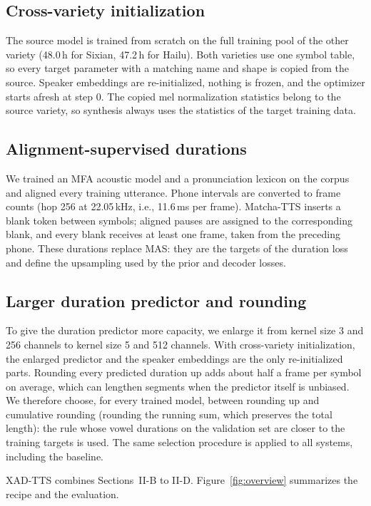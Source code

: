 \documentclass[conference,a4paper]{IEEEtran}
\begin{document}
\subsection{Cross-variety initialization}
The source model is trained from scratch on the full training pool of the other variety (48.0\,h for Sixian, 47.2\,h for Hailu). Both varieties use one symbol table, so every target parameter with a matching name and shape is copied from the source. Speaker embeddings are re-initialized, nothing is frozen, and the optimizer starts afresh at step 0. The copied mel normalization statistics belong to the source variety, so synthesis always uses the statistics of the target training data.

\subsection{Alignment-supervised durations}
We trained an MFA acoustic model and a pronunciation lexicon on the corpus and aligned every training utterance. Phone intervals are converted to frame counts (hop 256 at 22.05\,kHz, i.e., 11.6\,ms per frame). Matcha-TTS inserts a blank token between symbols; aligned pauses are assigned to the corresponding blank, and every blank receives at least one frame, taken from the preceding phone. These durations replace MAS: they are the targets of the duration loss and define the upsampling used by the prior and decoder losses.

\subsection{Larger duration predictor and rounding}
To give the duration predictor more capacity, we enlarge it from kernel size 3 and 256 channels to kernel size 5 and 512 channels. With cross-variety initialization, the enlarged predictor and the speaker embeddings are the only re-initialized parts. Rounding every predicted duration up adds about half a frame per symbol on average, which can lengthen segments when the predictor itself is unbiased. We therefore choose, for every trained model, between rounding up and cumulative rounding (rounding the running sum, which preserves the total length): the rule whose vowel durations on the validation set are closer to the training targets is used. The same selection procedure is applied to all systems, including the baseline.

XAD-TTS combines Sections~II-B to II-D. Figure~\ref{fig:overview} summarizes the recipe and the evaluation.
\end{document}
